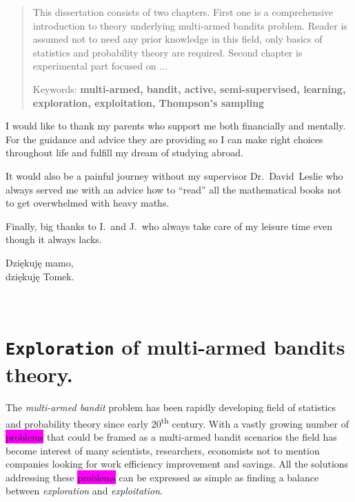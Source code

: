 \documentclass[12pt, a4paper, pdflatex]{report}
\newcommand{\ts}{\textsuperscript}
\newenvironment{dedication}
  {\clearpage           %
   \thispagestyle{empty}%
   \vspace*{\stretch{1}}%
   \itshape             %
   \raggedright          %
   \par\setlength{\leftskip}{0.3\textwidth}\noindent\ignorespaces
  }
  {\par %
   \vspace{\stretch{3}} %
   \clearpage           %
  }
\begin{document}
\begin{abstract}
\thispagestyle{empty}%
This dissertation consists of two chapters. First one is a comprehensive introduction to theory underlying multi-armed bandits problem. Reader is assumed not to need any prior knowledge in this field, only basics of statistics and probability theory are required. Second chapter is experimental part focused on ...
\begin{center}
Keywords: \textbf{multi-armed, bandit, active, semi-supervised, learning, exploration, exploitation, Thompson's sampling}
\end{center}
\end{abstract}

\begin{dedication}
I would like to thank my parents who support me both financially and mentally. For the guidance and advice they are providing so I can make right choices throughout life and fulfill my dream of studying abroad.\newline

It would also be a painful journey without my supervisor Dr.~David~Leslie who always served me with an advice how to ``read'' all the mathematical books not to get overwhelmed with heavy maths.\newline

Finally, big thanks to I.\ and J.\ who always take care of my leisure time even though it always lacks.\\[2cm]


\begin{flushright}
Dzi\k{e}kuj\k{e} mamo,\\
dzi\k{e}kuj\k{e} Tomek.
\end{flushright}



\textcolor{white}{found me!}



\end{dedication}


\newpage
\tableofcontents
\thispagestyle{empty}
\cleardoublepage
\pagestyle{plain}
\setcounter{page}{1}


\chapter{\texttt{\textbf{Exploration}} of multi-armed bandits theory.}
The \emph{multi-armed bandit} problem has been rapidly developing field of statistics and probability theory since early 20\ts{th} century. With a vastly growing number of \colorbox{magenta}{problems} that could be framed as a multi-armed bandit scenarios the field has become interest of many scientists, researchers, economists not to mention companies looking for work efficiency improvement and savings. All the solutions addressing these \colorbox{magenta}{problems} can be expressed as simple as finding a balance between \emph{exploration} and \emph{exploitation}.
\end{document}
